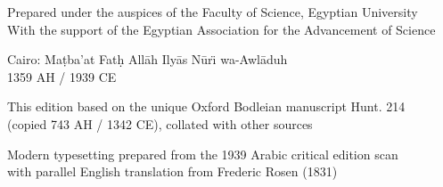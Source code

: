 \documentclass[11pt,a4paper,openany,oneside]{book}
\begin{document}
\begin{titlepage}
\begin{center}
\vspace{1cm}

{\small Prepared under the auspices of the Faculty of Science, Egyptian University}\\[0.2cm]
{\small With the support of the Egyptian Association for the Advancement of Science}

\vspace{0.8cm}

{\large Cairo: Ma\d{t}ba'at Fat\d{h} All\=ah Ily\=as N\=ur\"{\i} wa-Awl\=aduh}\\[0.2cm]
{\large 1359 AH / 1939 CE}

\vspace{0.5cm}

{\small This edition based on the unique Oxford Bodleian manuscript Hunt. 214}\\[0.1cm]
{\small (copied 743 AH / 1342 CE), collated with other sources}

\vfill

{\footnotesize Modern typesetting prepared from the 1939 Arabic critical edition scan}\\[0.1cm]
{\footnotesize with parallel English translation from Frederic Rosen (1831)}

\end{center}
\end{titlepage}
\end{document}
